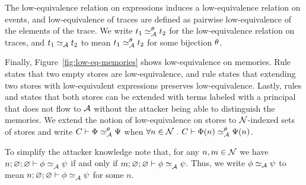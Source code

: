 The low-equivalence relation on expressions induces a low-equivalence relation on events, and low-equivalence of traces are defined as pairwise low-equivalence of the elements of the trace. We write $t_1 \simeq_{\mathcal{A}}^{\theta} t_2$ for the low-equivalence relation on traces, and $t_1 \simeq_{\mathcal{A}} t_2$ to mean $t_1 \simeq_{\mathcal{A}}^{\theta} t_2$ for some bijection $\theta$.

Finally, Figure~\ref{fig:low-eq-memories} shows low-equivalence on memories. Rule  states that two empty stores are low-equivalence, and rule  states that extending two stores with low-equivalent expressions preserves low-equivalence. Lastly, rules  and  states that both stores can be extended with terms labeled with a principal that does not flow to $\mathcal{A}$ without the attacker being able to distinguish the memories. We extend the notion of low-equivalence on stores to $\mathcal{N}$-indexed sets of stores and write $\loweq{C}{\Attacker}[\bijection]{\globalstore}{\altglobalstore}$ when $\forall n \in \Nameset~.~ \loweq{C}{\Attacker}[\bijection]{\globalstore(n)}{\altglobalstore(n)}$.

To simplify the attacker knowledge note that, for any $n, m \in \mathcal{N}$ we have $\loweq{n; \emptyenv; \emptyenv}{\Attacker}{\store}{\altstore}$ if and only if $\loweq{m; \emptyenv; \emptyenv}{\Attacker}{\store}{\altstore}$. Thus, we write $\phi \simeq_{\mathcal{A}} \psi$ to mean $\loweq{n; \emptyenv; \emptyenv}{\Attacker}{\store}{\altstore}$ for some $n$.

